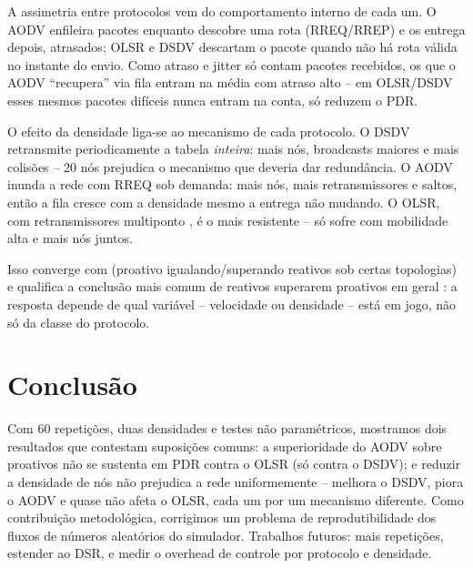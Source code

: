 \documentclass[12pt]{article}
\begin{document}
A assimetria entre protocolos vem do comportamento interno de cada um. O AODV enfileira pacotes enquanto descobre uma rota (RREQ/RREP) e os entrega depois, atrasados; OLSR e DSDV descartam o pacote quando não há rota válida no instante do envio. Como atraso e jitter só contam pacotes recebidos, os que o AODV ``recupera'' via fila entram na média com atraso alto -- em OLSR/DSDV esses mesmos pacotes difíceis nunca entram na conta, só reduzem o PDR.

O efeito da densidade liga-se ao mecanismo de cada protocolo. O DSDV retransmite periodicamente a tabela \emph{inteira}: mais nós, broadcasts maiores e mais colisões -- 20 nós prejudica o mecanismo que deveria dar redundância. O AODV inunda a rede com RREQ sob demanda: mais nós, mais retransmissores e saltos, então a fila cresce com a densidade mesmo a entrega não mudando. O OLSR, com retransmissores multiponto \cite{alzahrani2020}, é o mais resistente -- só sofre com mobilidade alta e mais nós juntos.

Isso converge com \cite{alkhatib2018} (proativo igualando/superando reativos sob certas topologias) e qualifica a conclusão mais comum de reativos superarem proativos em geral \cite{quadri2025,arunkumar2008,shrivastava2021}: a resposta depende de qual variável -- velocidade ou densidade -- está em jogo, não só da classe do protocolo.

\section{Conclusão}

Com 60 repetições, duas densidades e testes não paramétricos, mostramos dois resultados que contestam suposições comuns: a superioridade do AODV sobre proativos não se sustenta em PDR contra o OLSR (só contra o DSDV); e reduzir a densidade de nós não prejudica a rede uniformemente -- melhora o DSDV, piora o AODV e quase não afeta o OLSR, cada um por um mecanismo diferente. Como contribuição metodológica, corrigimos um problema de reprodutibilidade dos fluxos de números aleatórios do simulador. Trabalhos futuros: mais repetições, estender ao DSR, e medir o overhead de controle por protocolo e densidade.



\end{document}
